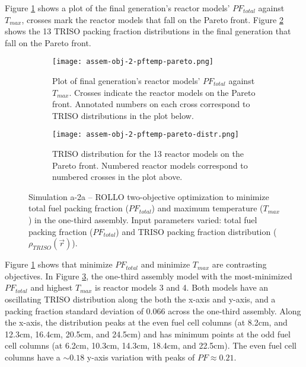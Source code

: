 Figure \ref{fig:assem-obj-2-pftemp-pareto} shows a plot of the final generation's reactor 
models' $PF_{total}$ against $T_{max}$, crosses mark the reactor models that fall on 
the Pareto front.
Figure \ref{fig:assem-obj-2-pftemp-pareto-distr} shows the 13 TRISO packing fraction 
distributions in the final generation that fall on the Pareto front. 
\begin{figure}[htbp!]
    \begin{subfigure}{\textwidth}
        \centering
        \texttt{[image: assem-obj-2-pftemp-pareto.png]}
        \caption{Plot of final generation's reactor models' $PF_{total}$ against 
        $T_{max}$. 
        Crosses indicate the reactor models on the Pareto front. Annotated numbers 
        on each cross correspond to TRISO distributions in the plot below.}
        \label{fig:assem-obj-2-pftemp-pareto} 
    \end{subfigure}
    \begin{subfigure}{\textwidth}
        \centering
        \texttt{[image: assem-obj-2-pftemp-pareto-distr.png]}
        \caption{TRISO distribution for the 13 reactor models on the Pareto front.
        Numbered reactor models correspond to numbered crosses in the plot above. }
        \label{fig:assem-obj-2-pftemp-pareto-distr} 
    \end{subfigure}
    \caption{Simulation a-2a -- ROLLO two-objective optimization to minimize total fuel 
    packing fraction ($PF_{total}$) and maximum temperature ($T_{max}$) in 
    the one-third assembly. 
    Input parameters varied: total fuel packing fraction ($PF_{total}$) and TRISO 
    packing fraction distribution ($\rho_{TRISO}(\vec{r})$).}
    \label{fig:assem-obj-2-pftemp}
\end{figure}

Figure \ref{fig:assem-obj-2-pftemp-pareto} shows that minimize $PF_{total}$ and 
minimize $T_{max}$ are contrasting objectives. 
In Figure \ref{fig:assem-obj-2-pftemp}, the one-third assembly model with the 
most-minimized $PF_{total}$ and highest $T_{max}$ is reactor models 3 and 4. 
Both models have an oscillating TRISO distribution along the both the 
x-axis and y-axis, and a packing fraction standard deviation of $0.066$ across the 
one-third assembly. 
Along the x-axis, the distribution peaks at the even fuel cell columns (at 8.2cm,  
and 12.3cm, 16.4cm, 20.5cm, and 24.5cm) and has minimum points at the odd fuel cell 
columns (at 6.2cm, 10.3cm, 14.3cm, 18.4cm, and 22.5cm).
The even fuel cell columns have a $\sim0.18$ y-axis variation with peaks of 
$PF\approx0.21$. 

